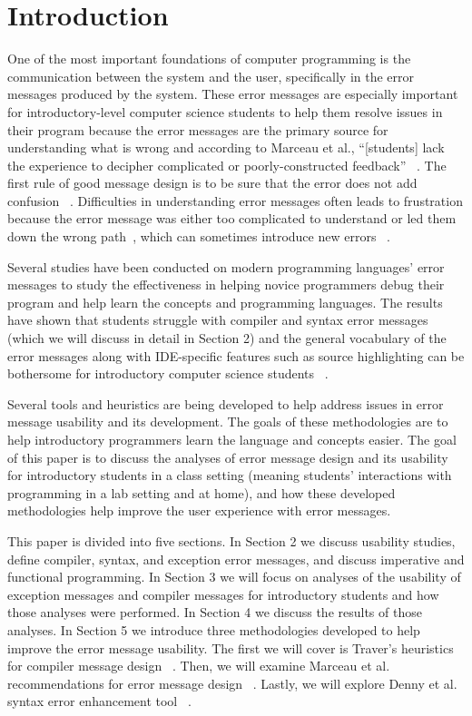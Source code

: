 \documentclass{sig-alternate}
\begin{document}
\section{Introduction}\label{intro}
One of the most important foundations of computer programming is the communication between the system and the user, specifically in the error messages produced by the system.
These error messages are especially important for introductory-level computer science students to help them resolve issues in their program because the error messages are the primary source for understanding what is wrong and according to Marceau et al., ``[students] lack the experience to decipher complicated or poorly-constructed feedback'' ~\cite{Marceau:2011:MEE:1953163.1953308}.
The first rule of good message design is to be sure that the error does not add confusion ~\cite{Isa:1983:MOE:800045.801583}.
Difficulties in understanding error messages often leads to frustration because the error message was either too complicated to understand or led them down the wrong path~\cite{Marceau:2011:MYL:2048237.2048241}, which can sometimes introduce new errors ~\cite{Denny:2014:ESE:2591708.2591748}. 

Several studies have been conducted on modern programming languages' error messages to study the effectiveness in helping novice programmers debug their program and help learn the concepts and programming languages.
The results have shown that students struggle with compiler and syntax error messages ~\cite{Denny:2014:ESE:2591708.2591748} ~\cite{Traver:2010} (which we will discuss in detail in Section 2) and the general vocabulary of the error messages along with IDE-specific features such as source highlighting can be bothersome for introductory computer science students ~\cite{Marceau:2011:MYL:2048237.2048241}. 

Several tools and heuristics are being developed to help address issues in error message usability and its development.
The goals of these methodologies are to help introductory programmers learn the language and concepts easier.
The goal of this paper is to discuss the analyses of error message design and its usability for introductory students in a class setting (meaning students' interactions with programming in a lab setting and at home), and how these developed methodologies help improve the user experience with error messages. 

This paper is divided into five sections.
In Section 2 we discuss usability studies, define compiler, syntax, and exception error messages, and discuss imperative and functional programming.
In Section 3 we will focus on  analyses of the usability of exception messages and compiler messages for introductory students and how those analyses were performed.
In Section 4 we discuss the results of those analyses.
In Section 5 we introduce three methodologies developed to help improve the error message usability.
The first we will cover is Traver's heuristics for compiler message design ~\cite{Traver:2010}.
Then, we will examine Marceau et al. recommendations for error message design ~\cite{Marceau:2011:MYL:2048237.2048241}.
Lastly, we will explore Denny et al. syntax error enhancement tool ~\cite{Denny:2014:ESE:2591708.2591748}.
\end{document}
